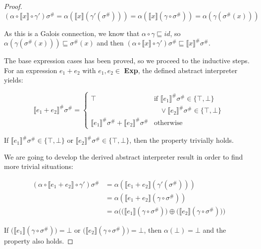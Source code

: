 \documentclass{article}
\begin{document}
\begin{proof}
  $$
    (\alpha \circ \llbracket x \rrbracket \circ \gamma') \sigma^\# = 
      \alpha (\llbracket x \rrbracket (\gamma' (\sigma^\#))) =
      \alpha (\llbracket x \rrbracket (\gamma \circ \sigma^\#)) =
      \alpha (\gamma(\sigma^\#(x)))
  $$

  As this is a Galois connection, we know that 
  $\alpha \circ \gamma \sqsubseteq id$, so
  $\alpha (\gamma(\sigma^\#(x))) \sqsubseteq \sigma^\#(x)$ and 
  then 
  $(\alpha \circ \llbracket x \rrbracket \circ \gamma') \sigma^\#
  \sqsubseteq \llbracket x \rrbracket^\# \sigma^\#
  $.

  The base expression cases has been proved, so we proceed 
  to the inductive steps. For an expression 
  $e_1 + e_2$ with $e_1, e_2 \in$ \textbf{Exp}, the defined
  abstract interpreter yields:

  $$
    \llbracket e_1 + e_2 \rrbracket^\# \sigma^\# = 
    \begin{cases}
      \top & \text{if } 
        \llbracket e_1 \rrbracket^\# \sigma^\# 
          \in \{\top, \bot\} \\ 
        &\;\;\;\lor
        \llbracket e_2 \rrbracket^\# \sigma^\# 
          \in \{\top, \bot\} \\
        \llbracket e_1 \rrbracket^\# \sigma^\# 
          + \llbracket e_2 \rrbracket^\# \sigma^\# 
          & \text{otherwise} 
    \end{cases}
  $$

  If $\llbracket e_1 \rrbracket^\# \sigma^\# 
    \in \{\top, \bot\}$ or 
  $\llbracket e_2 \rrbracket^\# \sigma^\# 
    \in \{\top, \bot\}$, then the property trivially holds.

  We are going to develop the derived abstract interpreter
  result in order to find more trivial situations:

  \begin{align*}
    (
      \alpha \circ \llbracket e_1 + e_2 \rrbracket \circ \gamma'
    )\sigma^\# &= 
    \alpha (
      \llbracket e_1 + e_2 \rrbracket (\gamma' (\sigma^\#))
    ) \\ &=
    \alpha (
      \llbracket e_1 + e_2 \rrbracket (\gamma \circ \sigma^\#)
    ) \\ &=
    \alpha \Bigg(
      \Big(\llbracket e_1\rrbracket(\gamma \circ \sigma^\#)\Big) 
      \oplus
      \Big(\llbracket e_2\rrbracket(\gamma \circ \sigma^\#)\Big)
    \Bigg)
  \end{align*}

  If $\Big(\llbracket e_1\rrbracket(\gamma \circ \sigma^\#)\Big)
  = \bot$ or 
  $\Big(\llbracket e_2\rrbracket(\gamma \circ \sigma^\#)\Big)
  = \bot$, then $\alpha(\bot) = \bot$ and the property also 
  holds.


\end{proof}
\end{document}

